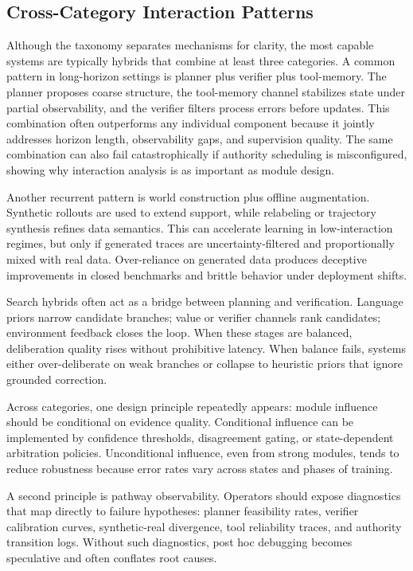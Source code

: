 \documentclass[pdflatex,sn-mathphys-num]{sn-jnl}
\begin{document}
\subsection{Cross-Category Interaction Patterns}
Although the taxonomy separates mechanisms for clarity, the most capable systems are typically hybrids that combine at least three categories. A common pattern in long-horizon settings is planner plus verifier plus tool-memory. The planner proposes coarse structure, the tool-memory channel stabilizes state under partial observability, and the verifier filters process errors before updates. This combination often outperforms any individual component because it jointly addresses horizon length, observability gaps, and supervision quality. The same combination can also fail catastrophically if authority scheduling is misconfigured, showing why interaction analysis is as important as module design.

Another recurrent pattern is world construction plus offline augmentation. Synthetic rollouts are used to extend support, while relabeling or trajectory synthesis refines data semantics. This can accelerate learning in low-interaction regimes, but only if generated traces are uncertainty-filtered and proportionally mixed with real data. Over-reliance on generated data produces deceptive improvements in closed benchmarks and brittle behavior under deployment shifts.

Search hybrids often act as a bridge between planning and verification. Language priors narrow candidate branches; value or verifier channels rank candidates; environment feedback closes the loop. When these stages are balanced, deliberation quality rises without prohibitive latency. When balance fails, systems either over-deliberate on weak branches or collapse to heuristic priors that ignore grounded correction.

Across categories, one design principle repeatedly appears: module influence should be conditional on evidence quality. Conditional influence can be implemented by confidence thresholds, disagreement gating, or state-dependent arbitration policies. Unconditional influence, even from strong modules, tends to reduce robustness because error rates vary across states and phases of training.

A second principle is pathway observability. Operators should expose diagnostics that map directly to failure hypotheses: planner feasibility rates, verifier calibration curves, synthetic-real divergence, tool reliability traces, and authority transition logs. Without such diagnostics, post hoc debugging becomes speculative and often conflates root causes.
\end{document}
